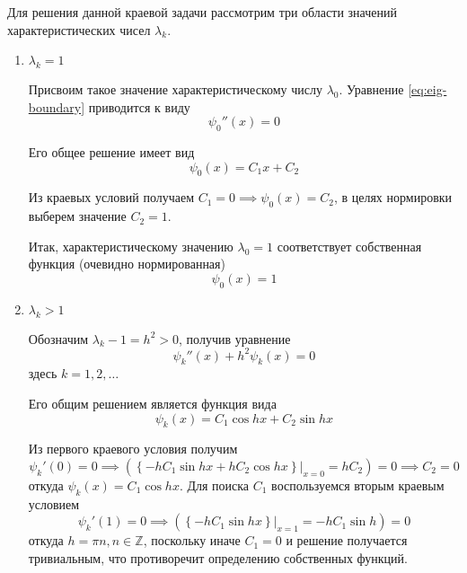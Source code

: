 \documentclass[11pt]{article}
\numberwithin{equation}{section}
\providecommand{\at}[2]{\left. {#1}\right\vert_{#2}}
\providecommand{\set}[1]{\mathbb{#1}}
\begin{document}
Для решения данной краевой задачи рассмотрим три области значений
характеристических чисел $\lambda_k$.
\begin{enumerate}
\item $\lambda_k=1$

  Присвоим такое значение характеристическому числу $\lambda_0$.
  Уравнение \eqref{eq:eig-boundary} приводится к виду
  \begin{equation*}
    \psi_0''(x)=0
  \end{equation*}

  Его общее решение имеет вид
  \begin{equation*}
    \psi_0(x) = C_1x+C_2
  \end{equation*}

  Из краевых условий получаем $C_1=0 \implies \psi_0(x) = C_2$, в целях
  нормировки выберем значение $C_2 = 1$.

  Итак, характеристическому значению $\lambda_0=1$ соответствует
  собственная функция (очевидно нормированная)
  \begin{equation*}
    \psi_0(x) = 1
  \end{equation*}

\item $\lambda_k > 1$
  
  Обозначим $\lambda_k-1 = h^2 > 0$, получив уравнение
  \begin{equation*}
    \psi_k''(x)+h^2\psi_k(x) = 0
  \end{equation*}
  здесь $k = 1, 2, \dotsc$

  Его общим решением является функция вида
  \begin{equation*}
    \psi_k(x) = C_1 \cos{hx} + C_2 \sin{hx}
  \end{equation*}

  Из первого краевого условия получим
  \begin{equation*}
    \psi_k'(0) = 0 \implies \left( \at{\left \{ -h C_1 \sin{hx} + h C_2 \cos{hx} \right \}}{x=0} =
      h C_2 \right) = 0 \implies C_2 = 0
  \end{equation*}
  откуда $\psi_k(x) = C_1 \cos{hx}$. Для поиска $C_1$ воспользуемся
  вторым краевым условием
  \begin{equation*}
    \psi_k'(1) = 0 \implies \left( \at{\left \{ -h C_1 \sin{hx} \right \}}{x=1} =
      - h C_1 \sin{h} \right) = 0
  \end{equation*}
  откуда $h = \pi n, n \in \set{Z}$, поскольку иначе $C_1 = 0$ и
  решение получается тривиальным, что противоречит определению
  собственных функций.


\end{enumerate}
\end{document}
